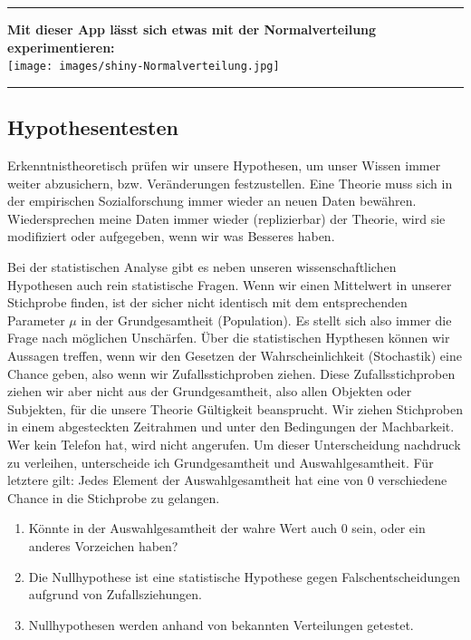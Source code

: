 \documentclass[
  10pt,
  letterpaper,
  a4paper, twoside]{scrreprt}
\providecommand{\tightlist}{%
  \setlength{\itemsep}{0pt}\setlength{\parskip}{0pt}}\usepackage{longtable,booktabs,array}
\begin{document}
\begin{center}\rule{0.5\linewidth}{0.5pt}\end{center}

\textbf{Mit dieser App lässt sich etwas mit der Normalverteilung
experimentieren:}\\
\texttt{[image: images/shiny-Normalverteilung.jpg]}

\begin{center}\rule{0.5\linewidth}{0.5pt}\end{center}

\subsection{Hypothesentesten}\label{hypothesentesten}

Erkenntnistheoretisch prüfen wir unsere Hypothesen, um unser Wissen
immer weiter abzusichern, bzw. Veränderungen festzustellen. Eine Theorie
muss sich in der empirischen Sozialforschung immer wieder an neuen Daten
bewähren. Wiedersprechen meine Daten immer wieder (replizierbar) der
Theorie, wird sie modifiziert oder aufgegeben, wenn wir was Besseres
haben.

Bei der statistischen Analyse gibt es neben unseren wissenschaftlichen
Hypothesen auch rein statistische Fragen. Wenn wir einen Mittelwert in
unserer Stichprobe finden, ist der sicher nicht identisch mit dem
entsprechenden Parameter \(\mu\) in der Grundgesamtheit (Population). Es
stellt sich also immer die Frage nach möglichen Unschärfen. Über die
statistischen Hypthesen können wir Aussagen treffen, wenn wir den
Gesetzen der Wahrscheinlichkeit (Stochastik) eine Chance geben, also
wenn wir Zufallsstichproben ziehen. Diese Zufallsstichproben ziehen wir
aber nicht aus der Grundgesamtheit, also allen Objekten oder Subjekten,
für die unsere Theorie Gültigkeit beansprucht. Wir ziehen Stichproben in
einem abgesteckten Zeitrahmen und unter den Bedingungen der Machbarkeit.
Wer kein Telefon hat, wird nicht angerufen. Um dieser Unterscheidung
nachdruck zu verleihen, unterscheide ich Grundgesamtheit und
Auswahlgesamtheit. Für letztere gilt: Jedes Element der
Auswahlgesamtheit hat eine von 0 verschiedene Chance in die Stichprobe
zu gelangen.

\begin{enumerate}
\def\labelenumi{\arabic{enumi}.}
\tightlist
\item
  Könnte in der Auswahlgesamtheit der wahre Wert auch 0 sein, oder ein
  anderes Vorzeichen haben?
\item
  Die Nullhypothese ist eine statistische Hypothese gegen
  Falschentscheidungen aufgrund von Zufallsziehungen.
\item
  Nullhypothesen werden anhand von bekannten Verteilungen getestet.
\end{enumerate}
\end{document}
